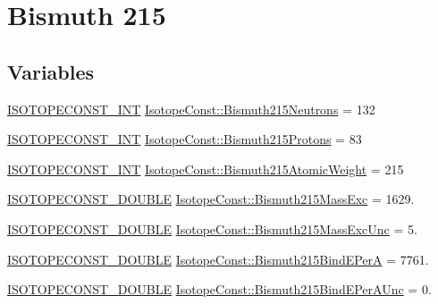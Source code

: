 \hypertarget{group___isotope_const-_bismuth-_bi215}{}\section{Bismuth 215}
\label{group___isotope_const-_bismuth-_bi215}
\subsection*{Variables}
\begin{DoxyCompactItemize}
\item 
\mbox{\hyperlink{group___isotope_const-_macros_ga5f18360b3e99483a35c32d789e62621c}{I\+S\+O\+T\+O\+P\+E\+C\+O\+N\+S\+T\+\_\+\+I\+NT}} \mbox{\hyperlink{group___isotope_const-_bismuth-_bi215_ga8ed10a5dd17d23919f5b34cc8a0678a9}{Isotope\+Const\+::\+Bismuth215\+Neutrons}} = 132
\item 
\mbox{\hyperlink{group___isotope_const-_macros_ga5f18360b3e99483a35c32d789e62621c}{I\+S\+O\+T\+O\+P\+E\+C\+O\+N\+S\+T\+\_\+\+I\+NT}} \mbox{\hyperlink{group___isotope_const-_bismuth-_bi215_ga057d1e426f91c5bc33c641031323da95}{Isotope\+Const\+::\+Bismuth215\+Protons}} = 83
\item 
\mbox{\hyperlink{group___isotope_const-_macros_ga5f18360b3e99483a35c32d789e62621c}{I\+S\+O\+T\+O\+P\+E\+C\+O\+N\+S\+T\+\_\+\+I\+NT}} \mbox{\hyperlink{group___isotope_const-_bismuth-_bi215_ga792d518ad82b0edc4c40fb9ac8c7b872}{Isotope\+Const\+::\+Bismuth215\+Atomic\+Weight}} = 215
\item 
\mbox{\hyperlink{group___isotope_const-_macros_ga8f45a7272ce02c0b4c65c44636ed719a}{I\+S\+O\+T\+O\+P\+E\+C\+O\+N\+S\+T\+\_\+\+D\+O\+U\+B\+LE}} \mbox{\hyperlink{group___isotope_const-_bismuth-_bi215_gaa0eb7f4d9937a90eca9d6323e0092352}{Isotope\+Const\+::\+Bismuth215\+Mass\+Exc}} = 1629.
\item 
\mbox{\hyperlink{group___isotope_const-_macros_ga8f45a7272ce02c0b4c65c44636ed719a}{I\+S\+O\+T\+O\+P\+E\+C\+O\+N\+S\+T\+\_\+\+D\+O\+U\+B\+LE}} \mbox{\hyperlink{group___isotope_const-_bismuth-_bi215_gae469c149c8614db03ec70fb80f1d7026}{Isotope\+Const\+::\+Bismuth215\+Mass\+Exc\+Unc}} = 5.
\item 
\mbox{\hyperlink{group___isotope_const-_macros_ga8f45a7272ce02c0b4c65c44636ed719a}{I\+S\+O\+T\+O\+P\+E\+C\+O\+N\+S\+T\+\_\+\+D\+O\+U\+B\+LE}} \mbox{\hyperlink{group___isotope_const-_bismuth-_bi215_ga4fa12524a13726767338cdfe3167fac2}{Isotope\+Const\+::\+Bismuth215\+Bind\+E\+PerA}} = 7761.
\item 
\mbox{\hyperlink{group___isotope_const-_macros_ga8f45a7272ce02c0b4c65c44636ed719a}{I\+S\+O\+T\+O\+P\+E\+C\+O\+N\+S\+T\+\_\+\+D\+O\+U\+B\+LE}} \mbox{\hyperlink{group___isotope_const-_bismuth-_bi215_ga1ff6db3bf269e9fc87877a8fef8964b2}{Isotope\+Const\+::\+Bismuth215\+Bind\+E\+Per\+A\+Unc}} = 0.

\end{DoxyCompactItemize}
